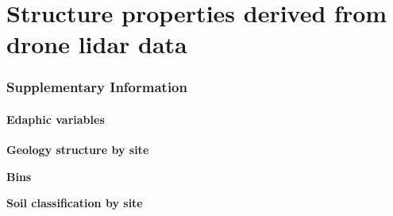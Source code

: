 \documentclass{thesis}
\begin{document}





\setcounter{chapter}{0}

\part{Structure properties derived from drone lidar data}






\clearpage
\label{app:bibTex}

\appendix

\vspace{-1em}

\section{Supplementary Information}\label{app:dataset}

\subsection{Edaphic variables}
\textbf{Geology structure by site}

\begin{figure}[h!]
	\centering
\end{figure}

\textbf{Bins}

\begin{figure}[h!]
	\centering
\end{figure}

\newpage
\textbf{Soil classification by site}

\begin{figure}[h!]
	\centering
\end{figure}
\end{document}
